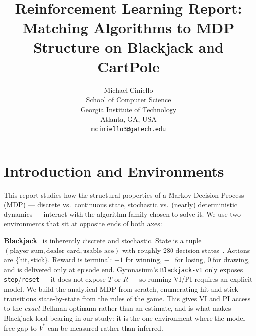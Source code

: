 \documentclass[conference]{IEEEtran}
\title{\LARGE \bf
Reinforcement Learning Report: \\
Matching Algorithms to MDP Structure on Blackjack and CartPole
}
\author{
\parbox{3in}{
\centering
Michael Ciniello \\
School of Computer Science \\
Georgia Institute of Technology \\
Atlanta, GA, USA \\
{\tt\small mciniello3@gatech.edu}
}
}
\begin{document}
\maketitle
\thispagestyle{empty}
\pagestyle{empty}


\section{Introduction and Environments}

This report studies how the structural properties of a Markov Decision
Process (MDP) --- discrete vs.\ continuous state, stochastic vs.\ (nearly)
deterministic dynamics --- interact with the algorithm family chosen to
solve it. We use two environments that sit at opposite ends of both axes:

\textbf{Blackjack}~\cite{sutton2018} is inherently discrete and stochastic.
State is a tuple $(\text{player sum}, \text{dealer card}, \text{usable ace})$
with roughly 280 decision states~\cite{gym_blackjack}. Actions are
$\{\text{hit}, \text{stick}\}$. Reward is terminal: $+1$ for winning, $-1$
for losing, $0$ for drawing, and is delivered only at episode end.
Gymnasium's \texttt{Blackjack-v1} only exposes
\texttt{step}/\texttt{reset} --- it does not expose $T$ or $R$ --- so
running VI/PI requires an explicit model. We build the analytical MDP
from scratch, enumerating hit and stick transitions state-by-state from
the rules of the game. This gives VI and PI access to the
\emph{exact} Bellman optimum rather than an estimate, and is what makes
Blackjack load-bearing in our study: it is the one environment where the
model-free gap to $V^*$ can be measured rather than inferred.
\end{document}
